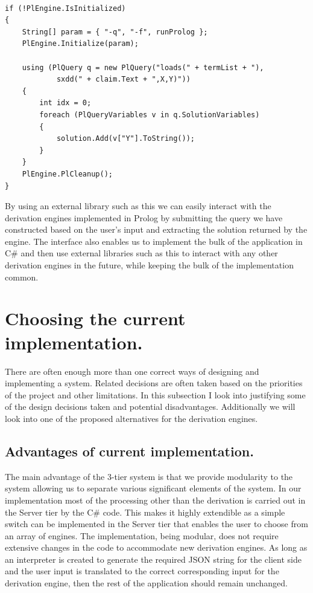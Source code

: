 \begin{Verbatim}[frame=single]

if (!PlEngine.IsInitialized)
{
    String[] param = { "-q", "-f", runProlog };  
    PlEngine.Initialize(param);

    using (PlQuery q = new PlQuery("loads(" + termList + "),
    		sxdd(" + claim.Text + ",X,Y)"))
    {
    	int idx = 0;
        foreach (PlQueryVariables v in q.SolutionVariables)
        {
        	solution.Add(v["Y"].ToString());
        }
    }
    PlEngine.PlCleanup();
}

\end{Verbatim}

By using an external library such as this we can easily interact with the derivation engines implemented in Prolog by submitting the query we have constructed based on the user's input and extracting the solution returned by the engine. The interface also enables us to implement the bulk of the application in C\# and then use external libraries such as this to interact with any other derivation engines in the future, while keeping the bulk of the implementation common.

\section{Choosing the current implementation.}

There are often enough more than one correct ways of designing and implementing a system. Related decisions are often taken based on the priorities of the project and other limitations. In this subsection I look into justifying some of the design decisions taken and potential disadvantages. Additionally we will look into one of the proposed alternatives for the derivation engines.

\subsection{Advantages of current implementation.}
The main advantage of the 3-tier system is that we provide modularity to the system allowing us to separate various significant elements of the system. In our implementation most of the processing other than the derivation is carried out in the Server tier by the C\# code. This makes it highly extendible as a simple switch can be implemented in the Server tier that enables the user to choose from an array of engines. The implementation, being modular, does not require extensive changes in the code to accommodate new derivation engines. As long as an interpreter is created to generate the required JSON string for the client side and the user input is translated to the correct corresponding input for the derivation engine, then the rest of the application should remain unchanged.

